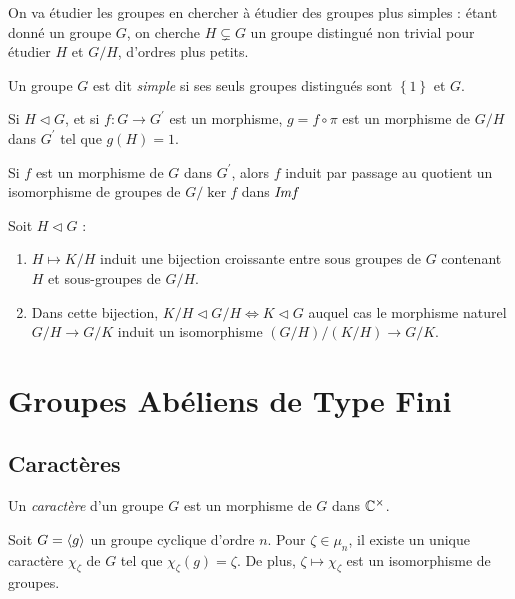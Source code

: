 \documentclass{cours}
\begin{document}
On va étudier les groupes en chercher à étudier des groupes plus simples : étant donné un groupe $G$, on cherche $H \subsetneq G$ un groupe distingué non trivial pour étudier $H$ et $G/H$, d'ordres plus petits.
\begin{definition}
    Un groupe $G$ est dit \emph{simple} si ses seuls groupes distingués sont $\left\{1\right\}$ et $G$.
\end{definition}

\begin{theorem}\label{grpquotients}
    Si $H \lhd G$, et si $f : G \rightarrow G^{'}$ est un morphisme, $g = f \circ \pi$ est un morphisme de $G/H$ dans $G^{'}$ tel que $g(H) = {1}$.
\end{theorem}

\begin{theorem}
    Si $f$ est un morphisme de $G$ dans $G^{'}$, alors $f$ induit par passage au quotient un isomorphisme de groupes de $G/\ker f$ dans $\emph{Im} f$
\end{theorem}

\begin{proposition}
    Soit $H \lhd G$ :
    \begin{enumerate}
        \item $H \mapsto K/H$ induit une bijection croissante entre sous groupes de $G$ contenant $H$ et sous-groupes de $G/H$.
        \item Dans cette bijection, $K/H \lhd G/H \Leftrightarrow K \lhd G$ auquel cas le morphisme naturel $G/H \rightarrow G/K$ induit un isomorphisme $\left(G/H\right)/\left(K/H\right) \rightarrow G/K$.
    \end{enumerate}
\end{proposition}

\newpage
\section{Groupes Abéliens de Type Fini}
\subsection{Caractères}
\begin{definition}
    Un \emph{caractère} d'un groupe $G$ est un morphisme de $G$ dans $\mathbb{C}^{\times}$.
\end{definition}

\begin{proposition}
    Soit $G = \left\langle g \right\rangle$ un groupe cyclique d'ordre $n$. Pour $\zeta \in \mu_{n}$, il existe un unique caractère $\chi_{\zeta}$ de $G$ tel que $\chi_{\zeta}(g) = \zeta$. De plus, $\zeta \mapsto \chi_{\zeta}$ est un isomorphisme de groupes.
\end{proposition}
\end{document}
